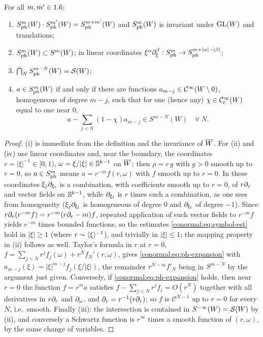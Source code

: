 \begin{lemma}\label{conormal:lem:classical-basic}
  For all $m,m'\in1.6$:
  \begin{enumerate}[label=(\roman*)]
  \item $S^{m}_{\mathrm{ph}}(W)\cdot S^{m'}_{\mathrm{ph}}(W)=S^{m+m'}_{\mathrm{ph}}(W)$ and $S^{m}_{\mathrm{ph}}(W)$ is
    invariant under $\operatorname{GL}(W)$ and translations;
  \item $S^{m}_{\mathrm{ph}}(W)\subset S^m(W)$; in linear coordinates
    $\xi^\alpha\partial_\xi^\beta:S^{m}_{\mathrm{ph}}\to S^{m+|\alpha|-|\beta|}_{\mathrm{ph}}$;
  \item $\bigcap_NS^{m-N}_{\mathrm{ph}}(W)=\mathcal{S}(W)$;
  \item $a\in S^{m}_{\mathrm{ph}}(W)$ if and only if there are functions
    $a_{m-j}\in\mathcal{C}^\infty(W\setminus0)$, homogeneous of degree $m-j$, such that for
    one (hence any) $\chi\in\mathcal{C}^\infty_{\mathrm{c}}(W)$ equal to one near $0$,
    \begin{equation}\label{conormal:eq:ph-expansion}
      a-\sum_{j<N}(1-\chi)a_{m-j}\in S^{m-N}(W)\quad\forall\ N.
    \end{equation}
  \end{enumerate}
\end{lemma}
\begin{proof}
  (i) is immediate from the definition and the invariance of $\overline{W}$.  For
  (ii) and (iv) use linear coordinates and, near the boundary, the coordinates
  $r=|\xi|^{-1}\in[0,1)$, $\omega=\xi/|\xi|\in\mathbb{S}^{k-1}$ on $\overline{W}$; then
  $\rho=r\,g$ with $g>0$ smooth up to $r=0$, so $a\in S^{m}_{\mathrm{ph}}$ means
  $a=r^{-m}f(r,\omega)$ with $f$ smooth up to $r=0$.  In these coordinates
  $\xi_j\partial_{\xi_l}$ is a combination, with coefficients smooth up to $r=0$, of
  $r\partial_r$ and vector fields on $\mathbb{S}^{k-1}$, while $\partial_{\xi_l}$ is $r$ times
  such a combination,
  as one sees from homogeneity ($\xi_j\partial_{\xi_l}$ is homogeneous of degree $0$
  and $\partial_{\xi_l}$ of degree $-1$).  Since $r\partial_r(r^{-m}f)=r^{-m}(r\partial_r-m)f$,
  repeated application of such vector fields to $r^{-m}f$ yields $r^{-m}$ times
  bounded functions, so the estimates \eqref{conormal:eq:symbol-est} hold in
  $|\xi|\ge1$ (where $r\sim\langle \xi\rangle^{-1}$), and trivially in $|\xi|\le1$; the
  mapping property in (ii) follows as well.  Taylor's formula in $r$ at $r=0$,
  $f=\sum_{j<N}r^jf_j(\omega)+r^Nf_N'(r,\omega)$, gives
  \eqref{conormal:eq:ph-expansion} with
  $a_{m-j}(\xi)=|\xi|^{m-j}f_j(\xi/|\xi|)$, the remainder $r^{N-m}f'_N$ being in
  $S^{m-N}$ by the argument just given.  Conversely, if
  \eqref{conormal:eq:ph-expansion} holds, then near $r=0$ the function
  $f=r^{m}a$ satisfies $f-\sum_{j<N}r^jf_j=O(r^N)$ together with all
  derivatives in $r\partial_r$ and $\partial_\omega$, and $\partial_r=r^{-1}(r\partial_r)$; so $f$ is
  $\mathcal C^{N-1}$ up to $r=0$ for every $N$, i.e.\ smooth.  Finally (iii): the
  intersection is contained in $S^{-\infty}(W)=\mathcal{S}(W)$ by (ii), and conversely a
  Schwartz function is $r^\infty$ times a smooth function of $(r,\omega)$, by
  the same change of variables.
\end{proof}

